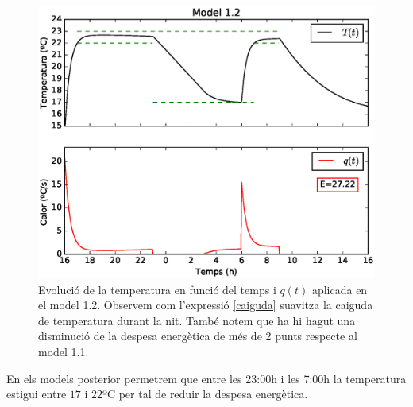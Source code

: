 \documentclass[11pt]{article}
\begin{document}
	\begin{figure}[h!]
		\centering
		\includegraphics[width=12cm]{model12.eps}
		\caption{Evolució de la temperatura en funció del temps i $q(t)$ aplicada en el model 1.2. Observem com l'expressió \eqref{caiguda} suavitza la caiguda de temperatura durant la nit. També notem que ha hi hagut una disminució de la despesa energètica de més de 2 punts respecte al model 1.1.}
		\label{figmodel12}
	\end{figure}
	En els models posterior permetrem que entre les 23:00h i les 7:00h la temperatura estigui entre $17$ i $22$ºC per tal de reduir la despesa energètica.
\end{document}
